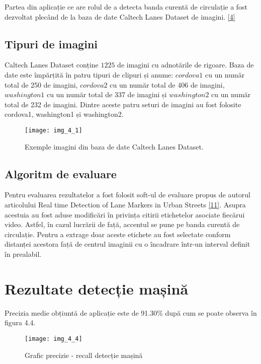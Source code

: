 Partea din aplicație ce are rolul de a detecta banda curentă de circulație a fost dezvoltat plecând de la baza de date Caltech Lanes Dataset de imagini.  \hyperlink{Bazadedatebenzidecirculatie}{[4]}

\subsection*{Tipuri de imagini}

Caltech Lanes Dataset conține $1225$ de imagini cu adnotările de rigoare. Baza de date este împărțită în patru tipuri de clipuri și anume: $cordova1$ cu un număr total de 250 de imagini, $cordova2$ cu un număr total de 406 de imagini, $washington1$ cu un număr total de 337 de imagini și $washington2$ cu un număr total de 232 de imagini. Dintre aceste patru seturi de imagini au fost folosite cordova1, washington1 și washington2.

\begin{figure}[!h]
	\centering
	\texttt{[image: img\_4\_1]}
	\caption[Imagini Caltech Lanes Dataset]{Exemple imagini din baza de date Caltech Lanes Dataset.}
\end{figure} 

\subsection*{Algoritm de evaluare}

Pentru evaluarea rezultatelor a fost folosit soft-ul de evaluare propus de autorul articolului Real time Detection of Lane Markers in Urban Streets \hyperlink{MohamedAly}{[11]}. 
Asupra acestuia au fost aduse modificări în privința citirii etichetelor asociate fiecărui video. Astfel, în cazul lucrării de față, accentul se pune pe banda curentă de circulație. Pentru a extrage doar aceste etichete au fost selectate conform distanței acestora față de centrul imaginii cu o încadrare într-un interval definit în prealabil.

\section{Rezultate detecție mașină}

Precizia medie obțiuntă de aplicație este de 91.30\% după cum se poate observa în figura 4.4.

\begin{figure}[!h]
	\centering
	\texttt{[image: img\_4\_4]}
	\caption{Grafic precizie - recall detecție mașină}
\end{figure}

